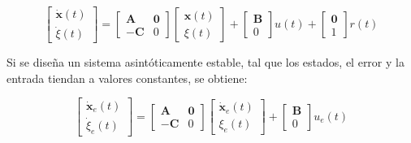 \vspace{-0.5cm}
\begin{equation}
        \begin{bmatrix}
            \dot{\textbf{x}}(t) \\
            \dot{\xi}(t)
        \end{bmatrix}
        =
        \begin{bmatrix}
            \textbf{A} & \textbf{0} \\
            -\textbf{C} & 0
        \end{bmatrix}
        \begin{bmatrix}
            \textbf{x}(t) \\
            \xi(t)
        \end{bmatrix}
        +
        \begin{bmatrix}
            \textbf{B} \\
            0
        \end{bmatrix}
        u(t)
        +
        \begin{bmatrix}
            \textbf{0} \\
            1
        \end{bmatrix}
        r(t)
    \label{eq:servosistema}
\end{equation}

Si se diseña un sistema asintóticamente estable, tal que los estados, el error y la entrada tiendan a valores constantes,
se obtiene:

\vspace{-0.5cm}
\begin{equation}
        \begin{bmatrix}
            \dot{\textbf{x}}_e(t) \\
            \dot{\xi}_e(t)
        \end{bmatrix}
        =
        \begin{bmatrix}
            \textbf{A} & \textbf{0} \\
            -\textbf{C} & 0
        \end{bmatrix}
        \begin{bmatrix}
            \dot{\textbf{x}}_e(t) \\
            \xi_e(t)
        \end{bmatrix}
        +
        \begin{bmatrix}
            \textbf{B} \\
            0
        \end{bmatrix}
        u_e(t)
\end{equation}


